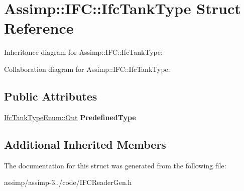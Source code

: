 \hypertarget{struct_assimp_1_1_i_f_c_1_1_ifc_tank_type}{\section{Assimp\+:\+:I\+F\+C\+:\+:Ifc\+Tank\+Type Struct Reference}
\label{struct_assimp_1_1_i_f_c_1_1_ifc_tank_type}
}


Inheritance diagram for Assimp\+:\+:I\+F\+C\+:\+:Ifc\+Tank\+Type\+:


Collaboration diagram for Assimp\+:\+:I\+F\+C\+:\+:Ifc\+Tank\+Type\+:
\subsection*{Public Attributes}
\begin{DoxyCompactItemize}
\item 
\hypertarget{struct_assimp_1_1_i_f_c_1_1_ifc_tank_type_ae66f82e2c604f627befca6d562031a6a}{\hyperlink{classboost_1_1shared__ptr}{Ifc\+Tank\+Type\+Enum\+::\+Out} {\bfseries Predefined\+Type}}\label{struct_assimp_1_1_i_f_c_1_1_ifc_tank_type_ae66f82e2c604f627befca6d562031a6a}

\end{DoxyCompactItemize}
\subsection*{Additional Inherited Members}


The documentation for this struct was generated from the following file\+:\begin{DoxyCompactItemize}
\item 
assimp/assimp-\/3../code/I\+F\+C\+Reader\+Gen.\+h\end{DoxyCompactItemize}
